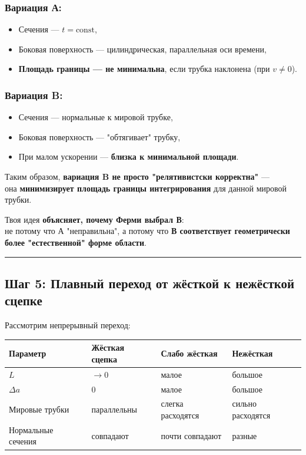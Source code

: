 \documentclass[11pt]{article}
\providecommand{\tightlist}{%
      \setlength{\itemsep}{0pt}\setlength{\parskip}{0pt}}
\begin{document}
\subsubsection{Вариация А:}

\begin{itemize}
\tightlist
\item
  Сечения --- \(t = \text{const}\),
\item
  Боковая поверхность --- цилиндрическая, параллельная оси времени,
\item
  \textbf{Площадь границы --- не минимальна}, если трубка наклонена (при
  \(v \ne 0\)).
\end{itemize}

\subsubsection{Вариация B:}

\begin{itemize}
\tightlist
\item
  Сечения --- нормальные к мировой трубке,
\item
  Боковая поверхность --- "обтягивает" трубку,
\item
  При малом ускорении --- \textbf{близка к минимальной площади}.
\end{itemize}

 Таким образом, \textbf{вариация B не просто "релятивистски корректна"}
---\\
она \textbf{минимизирует площадь границы интегрирования} для данной
мировой трубки.

 Твоя идея \textbf{объясняет, почему Ферми выбрал В}:\\
не потому что А "неправильна", а потому что \textbf{В соответствует
геометрически более "естественной" форме области}.

\begin{center}\rule{0.5\linewidth}{\linethickness}\end{center}

\subsection{ Шаг 5: Плавный переход от жёсткой к нежёсткой сцепке}

Рассмотрим непрерывный переход:

\begin{longtable}[]{@{}llll@{}}
\toprule
Параметр & Жёсткая сцепка & Слабо жёсткая & Нежёсткая\tabularnewline
\midrule
\endhead
\(L\) & \(\to 0\) & малое & большое\tabularnewline
\(\Delta a\) & 0 & малое & большое\tabularnewline
Мировые трубки & параллельны & слегка расходятся & сильно
расходятся\tabularnewline
Нормальные сечения & совпадают & почти совпадают & разные\tabularnewline
\bottomrule
\end{longtable}
\end{document}
